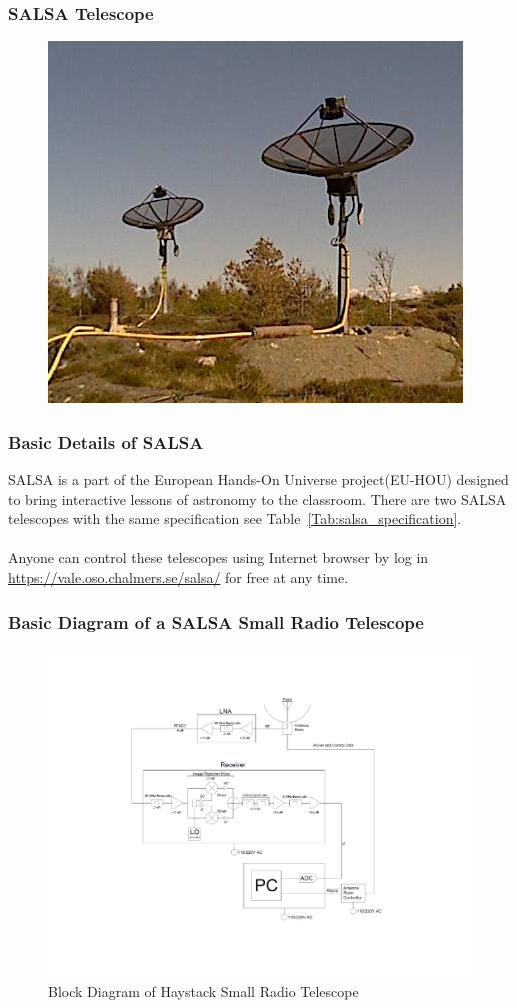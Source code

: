 \documentclass{beamer}
\begin{document}
\begin{frame}
\frametitle{SALSA Telescope}
\begin{figure}
\includegraphics[width=0.7\linewidth]{salsa.png}
\end{figure}
\end{frame}


\begin{frame}
\frametitle{Basic Details of SALSA}
SALSA is a part of the European Hands-On Universe project(EU-HOU)\cite{Ferlet2006} designed to bring interactive lessons of astronomy to the classroom. There are two SALSA telescopes with the same specification see Table~\ref{Tab:salsa_specification}\cite{ThomasBensby2017}.\\~\\ 
Anyone can control these telescopes using Internet browser by log in \url{https://vale.oso.chalmers.se/salsa/} for free at any time.
\end{frame}

\begin{frame}
\frametitle{Basic Diagram of a SALSA Small Radio Telescope}
\begin{figure}
\caption{Block Diagram of Haystack Small Radio Telescope\cite{DustinJohnson2012}}
\includegraphics[width=0.8\linewidth]{block}
\end{figure}
\end{frame}
\end{document}
